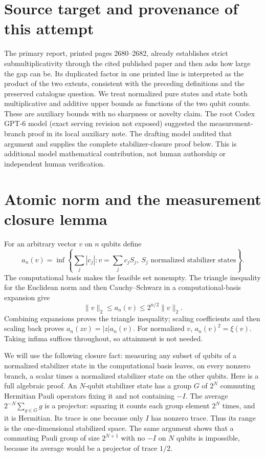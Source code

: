 \documentclass[11pt]{article}
\begin{document}
\section{Source target and provenance of this attempt}
The primary report, printed pages 2680--2682, already establishes
strict submultiplicativity through the cited published paper and
then asks how large the gap can be. Its duplicated factor in one
printed line is interpreted as the product of the two extents,
consistent with the preceding definitions and the preserved
catalogue question. We treat normalized pure states and state
both multiplicative and additive upper bounds as functions of
the two qubit counts. These are auxiliary bounds with no
sharpness or novelty claim.
The root Codex GPT-6 model (exact serving revision not exposed)
suggested the measurement-branch proof in its local auxiliary
note. The drafting model audited that argument and supplies the
complete stabilizer-closure proof below. This is additional
model mathematical contribution, not human authorship or
independent human verification.

\section{Atomic norm and the measurement closure lemma}
For an arbitrary vector $v$ on $n$ qubits define
\[
 a_n(v)=\inf\left\{\sum_j|c_j|:v=\sum_j c_jS_j,
 \ S_j\text{ normalized stabilizer states}\right\}.
\]
The computational basis makes the feasible set nonempty.
The triangle inequality for the Euclidean norm and then
Cauchy--Schwarz in a computational-basis expansion give
\[
 \|v\|_2\le a_n(v)\le2^{n/2}\|v\|_2.
\]
Combining expansions proves the triangle inequality; scaling
coefficients and then scaling back proves
$a_n(zv)=|z|a_n(v)$. For normalized $v$, $a_n(v)^2=\xi(v)$.
Taking infima suffices throughout, so attainment is not needed.

We will use the following closure fact: measuring any subset of
qubits of a normalized stabilizer state in the computational
basis leaves, on every nonzero branch, a scalar times a normalized
stabilizer state on the other qubits. Here is a full algebraic
proof. An $N$-qubit stabilizer state has a group $G$ of $2^N$
commuting Hermitian Pauli operators fixing it and not containing
$-I$. The average $2^{-N}\sum_{g\in G}g$ is a projector: squaring
it counts each group element $2^N$ times, and it is Hermitian.
Its trace is one because only $I$ has nonzero trace. Thus its
range is the one-dimensional stabilized space. The same argument
shows that a commuting Pauli group of size $2^{N+1}$ with no
$-I$ on $N$ qubits is impossible, because its average would be
a projector of trace $1/2$.
\end{document}

